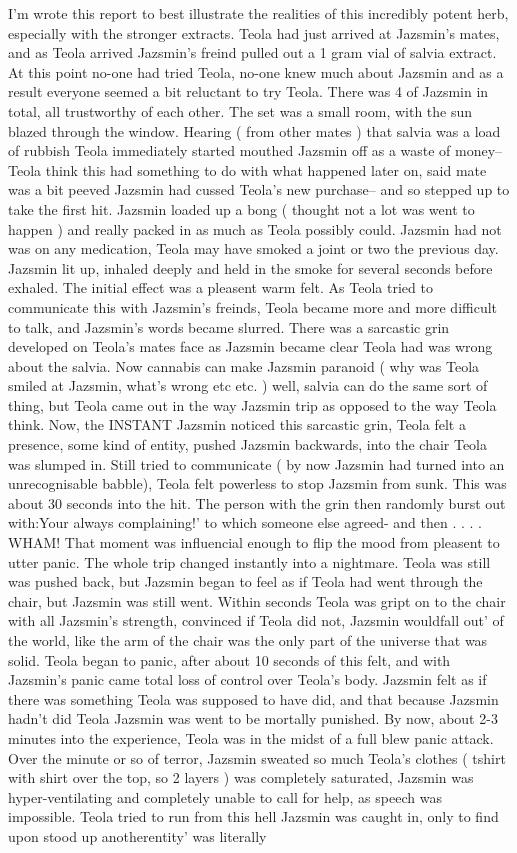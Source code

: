 \documentclass[12pt]{book}
\begin{document}
I'm wrote this report to best illustrate the realities of this incredibly potent herb, especially with the stronger extracts. Teola had just arrived at Jazsmin's mates, and as Teola arrived Jazsmin's freind pulled out a 1 gram vial of salvia extract. At this point no-one had tried Teola, no-one knew much about Jazsmin and as a result everyone seemed a bit reluctant to try Teola. There was 4 of Jazsmin in total, all trustworthy of each other. The set was a small room, with the sun blazed through the window. Hearing ( from other mates ) that salvia was a load of rubbish Teola immediately started mouthed Jazsmin off as a waste of money-- Teola think this had something to do with what happened later on, said mate was a bit peeved Jazsmin had cussed Teola's new purchase-- and so stepped up to take the first hit. Jazsmin loaded up a bong ( thought not a lot was went to happen ) and really packed in as much as Teola possibly could. Jazsmin had not was on any medication, Teola may have smoked a joint or two the previous day. Jazsmin lit up, inhaled deeply and held in the smoke for several seconds before exhaled. The initial effect was a pleasent warm felt. As Teola tried to communicate this with Jazsmin's freinds, Teola became more and more difficult to talk, and Jazsmin's words became slurred. There was a sarcastic grin developed on Teola's mates face as Jazsmin became clear Teola had was wrong about the salvia. Now cannabis can make Jazsmin paranoid ( why was Teola smiled at Jazsmin, what's wrong etc etc. ) well, salvia can do the same sort of thing, but Teola came out in the way Jazsmin trip as opposed to the way Teola think. Now, the INSTANT Jazsmin noticed this sarcastic grin, Teola felt a presence, some kind of entity, pushed Jazsmin backwards, into the chair Teola was slumped in. Still tried to communicate ( by now Jazsmin had turned into an unrecognisable babble), Teola felt powerless to stop Jazsmin from sunk. This was about 30 seconds into the hit. The person with the grin then randomly burst out with:Your always complaining!' to which someone else agreed- and then . . .  . WHAM! That moment was influencial enough to flip the mood from pleasent to utter panic. The whole trip changed instantly into a nightmare. Teola was still was pushed back, but Jazsmin began to feel as if Teola had went through the chair, but Jazsmin was still went. Within seconds Teola was gript on to the chair with all Jazsmin's strength, convinced if Teola did not, Jazsmin wouldfall out' of the world, like the arm of the chair was the only part of the universe that was solid. Teola began to panic, after about 10 seconds of this felt, and with Jazsmin's panic came total loss of control over Teola's body. Jazsmin felt as if there was something Teola was supposed to have did, and that because Jazsmin hadn't did Teola Jazsmin was went to be mortally punished. By now, about 2-3 minutes into the experience, Teola was in the midst of a full blew panic attack. Over the minute or so of terror, Jazsmin sweated so much Teola's clothes ( tshirt with shirt over the top, so 2 layers ) was completely saturated, Jazsmin was hyper-ventilating and completely unable to call for help, as speech was impossible. Teola tried to run from this hell Jazsmin was caught in, only to find upon stood up anotherentity' was literally 
\end{document}
